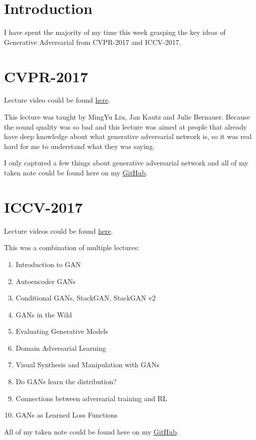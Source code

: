 \section{Introduction}
I have spent the majority of my time this week grasping the key ideas of Generative Adversarial from CVPR-2017\cite{cvpr17} and ICCV-2017\cite{iccv17}. 

\section{CVPR-2017}
Lecture video could be found \href{https://www.youtube.com/watch?v=KudkR-fFu_8}{here}.

This lecture was taught by MingYu Liu, Jan Kautz and Julie Bernauer. Because the sound quality was so bad and this lecture was aimed at people that already have deep knowledge about what generative adversarial network is, so it was real hard for me to understand what they was saying.

I only captured a few things about generative adversarial network and all of my taken note could be found here on my \href{https://github.com/tlvu2697/collection--generative-adversarial-network/tree/master/cvpr-17}{GitHub}.

\section{ICCV-2017}
Lecture videos could be found \href{https://www.youtube.com/playlist?list=PLazcgz-LJ6ZIrJV-qiqw16JyJFuE4TNKF}{here}.

This was a combination of multiple lectures:
\begin{enumerate}
\item Introduction to GAN\cite{gan}
\item Autoencoder GANs
\item Conditional GANs\cite{cgan}, StackGAN\cite{stackgan}, StackGAN v2\cite{stackganv2}
\item GANs in the Wild
\item Evaluating Generative Models
\item Domain Adversarial Learning\cite{adda}\cite{rozantsev}
\item Visual Synthesis and Manipulation with GANs
\item Do GANs learn the distribution?
\item Connections between adversarial training and RL
\item GANs as Learned Loss Functions
\end{enumerate}

All of my taken note could be found here on my \href{https://github.com/tlvu2697/collection--generative-adversarial-network/tree/master/iccv-17}{GitHub}.